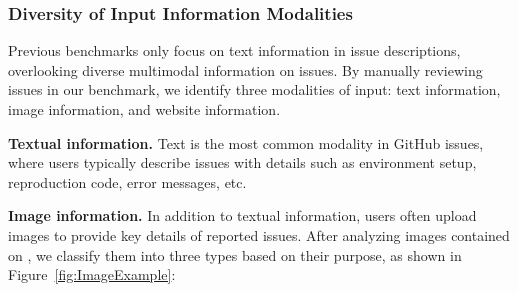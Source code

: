 
\subsubsection{Diversity of Input Information Modalities} Previous benchmarks only focus on text information in issue descriptions, overlooking diverse multimodal information on issues. By manually reviewing issues in our benchmark, we identify three modalities of input: text information, image information, and website information.

 
\textbf{Textual information.} Text is the most common modality in GitHub issues, where users typically describe issues with details such as environment setup, reproduction code, error messages, etc.

\textbf{Image information.}
In addition to textual information, users often upload images to provide key details of reported issues. After analyzing images contained on \Swebenchx, we classify them into three types based on their purpose, as shown in Figure~\ref{fig:ImageExample}: 


